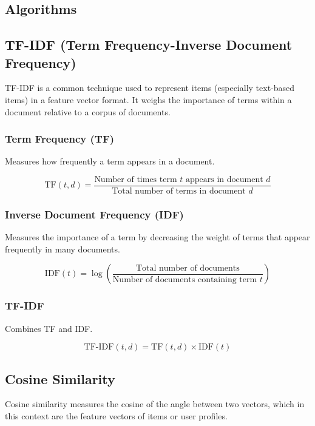 \documentclass[12pt, a4paper, oneside]{article}
\begin{document}
\subsection*{Algorithms}

\subsection*{TF-IDF (Term Frequency-Inverse Document Frequency)}

TF-IDF is a common technique used to represent items (especially text-based items) in a feature vector format. It weighs the importance of terms within a document relative to a corpus of documents.

\subsubsection*{Term Frequency (TF)}

Measures how frequently a term appears in a document.

\[
\text{TF}(t,d) = \frac{\text{Number of times term } t \text{ appears in document } d}{\text{Total number of terms in document } d}
\]

\subsubsection*{Inverse Document Frequency (IDF)}

Measures the importance of a term by decreasing the weight of terms that appear frequently in many documents.

\[
\text{IDF}(t) = \log \left(\frac{\text{Total number of documents}}{\text{Number of documents containing term } t}\right)
\]

\subsubsection*{TF-IDF}

Combines TF and IDF.

\[
\text{TF-IDF}(t,d) = \text{TF}(t,d) \times \text{IDF}(t)
\]

\subsection*{Cosine Similarity}

Cosine similarity measures the cosine of the angle between two vectors, which in this context are the feature vectors of items or user profiles.
\end{document}
